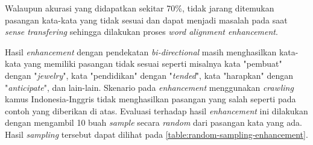 Walaupun akurasi yang didapatkan sekitar 70\%, tidak jarang ditemukan pasangan kata-kata yang tidak sesuai dan dapat menjadi masalah pada saat \textit{sense transfering} sehingga dilakukan proses \textit{word alignment enhancement}.

Hasil \textit{enhancement} dengan pendekatan \textit{bi-directional} masih menghasilkan kata-kata yang memiliki pasangan tidak sesuai seperti misalnya kata "pembuat" dengan "\textit{jewelry}", kata "pendidikan" dengan "\textit{tended}", kata "harapkan" dengan "\textit{anticipate}", dan lain-lain. Skenario pada \textit{enhancement} menggunakan \textit{crawling} kamus Indonesia-Inggris tidak menghasilkan pasangan yang salah seperti pada contoh yang diberikan di atas. Evaluasi terhadap hasil \textit{enhancement} ini dilakukan dengan mengambil 10 buah \textit{sample} secara \textit{random} dari pasangan kata yang ada. Hasil \textit{sampling} tersebut dapat dilihat pada \ref{table:random-sampling-enhancement}.

